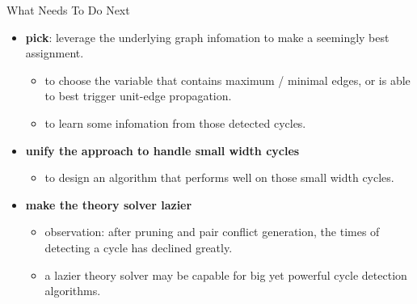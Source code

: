 \begin{frame}{What Needs To Do Next}
	\begin{itemize}
		\item \textbf{pick}: leverage the underlying graph infomation to make a seemingly best assignment.
		\begin{itemize}
			\item to choose the variable that contains maximum / minimal edges, or is able to best trigger unit-edge propagation.
			\item to learn some infomation from those detected cycles.
		\end{itemize}
		\item \textbf{unify the approach to handle small width cycles}
		\begin{itemize}
			\item to design an algorithm that performs well on those small width cycles.
		\end{itemize}
		\item \textbf{make the theory solver lazier}
		\begin{itemize}
			\item observation: after pruning and pair conflict generation, the times of detecting a cycle has declined greatly.
			\item a lazier theory solver may be capable for big yet powerful cycle detection algorithms.
		\end{itemize}
	\end{itemize}
\end{frame}

